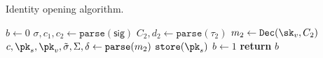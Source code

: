 \begin{algorithm}
    \caption{Identity opening algorithm.}
    \label{alg:idop}
    \begin{algorithmic}[1]
            \State $b \gets 0$
            \State $\sigma, c_1, c_2 \gets \mathtt{parse}( \mathsf{sig})$
            \State $C_2, d_2 \gets \mathtt{parse}(\tau_2)$
                \State $m_2 \gets \mathtt{Dec}(\sk_v, C_2)$
                \State $c, \pk_s, \pk_v, \tilde{\sigma}, \Sigma, \delta \gets \mathtt{parse}(m_2)$
                        \State $\mathtt{store}(\pk_s)$
                        \State $b \gets 1$
                    \EndIf
                \EndIf
            \EndIf
            \State \textbf{return} $b$
        \EndFunction
    \end{algorithmic}
\end{algorithm}